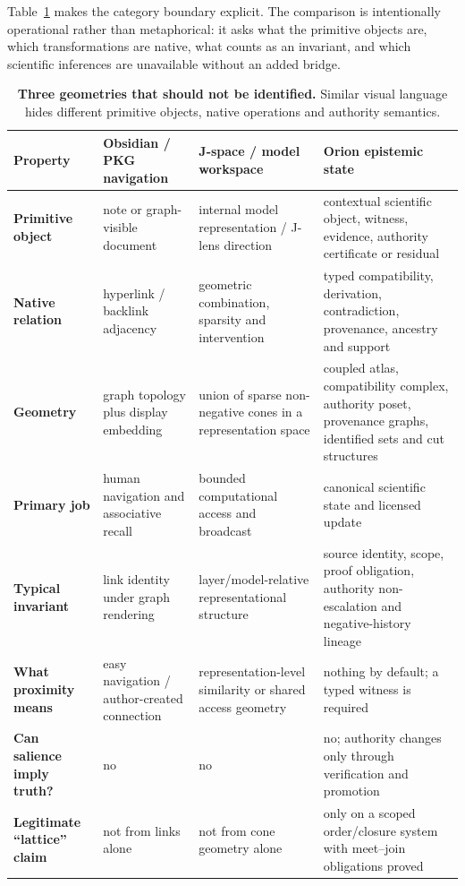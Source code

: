 Table~\ref{tab:three-geometries} makes the category boundary explicit. The comparison is intentionally operational rather than metaphorical: it asks what the primitive objects are, which transformations are native, what counts as an invariant, and which scientific inferences are unavailable without an added bridge.

\begin{table}[t]
\centering
\small
\caption{\textbf{Three geometries that should not be identified.} Similar visual language hides different primitive objects, native operations and authority semantics.}
\label{tab:three-geometries}
\begin{tabularx}{\textwidth}{>{\bfseries}p{}XXX}
\toprule
Property & Obsidian / PKG navigation & J-space / model workspace & Orion epistemic state \\
\midrule
Primitive object & note or graph-visible document & internal model representation / J-lens direction & contextual scientific object, witness, evidence, authority certificate or residual \\
Native relation & hyperlink / backlink adjacency & geometric combination, sparsity and intervention & typed compatibility, derivation, contradiction, provenance, ancestry and support \\
Geometry & graph topology plus display embedding & union of sparse non-negative cones in a representation space & coupled atlas, compatibility complex, authority poset, provenance graphs, identified sets and cut structures \\
Primary job & human navigation and associative recall & bounded computational access and broadcast & canonical scientific state and licensed update \\
Typical invariant & link identity under graph rendering & layer/model-relative representational structure & source identity, scope, proof obligation, authority non-escalation and negative-history lineage \\
What proximity means & easy navigation / author-created connection & representation-level similarity or shared access geometry & nothing by default; a typed witness is required \\
Can salience imply truth? & no & no & no; authority changes only through verification and promotion \\
Legitimate ``lattice'' claim & not from links alone & not from cone geometry alone & only on a scoped order/closure system with meet--join obligations proved \\
\bottomrule
\end{tabularx}
\end{table}

